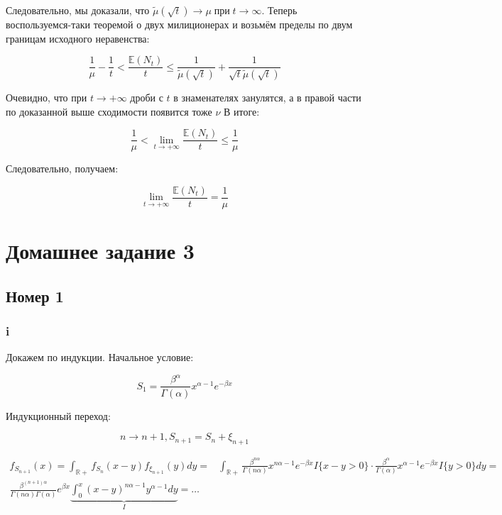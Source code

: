 \documentclass[a4paper,12pt]{article}
\def \mbb{\mathbb}
\def \R{\mbb R}
\def \E{\mbb{E}}
\begin{document}
Следовательно, мы доказали, что $\tilde{\mu}(\sqrt{t}) \rightarrow \mu \operatorname{ при } t \rightarrow \infty$. Теперь воспользуемся-таки теоремой о двух милиционерах и возьмём пределы по двум границам исходного неравенства:


\[ \frac{1}{\mu} - \frac{1 }{t}  < \frac{\E(N_t)}{t} \le \frac{1}{\tilde{\mu}(\sqrt{t})} +\frac{1}{\sqrt{t}\tilde{\mu}(\sqrt{t})} \]

Очевидно, что при $ t \to +\infty $ дроби с $ t $ в знаменателях занулятся, а в правой части по доказанной выше сходимости появится тоже $ \nu $ В итоге:

\[ \frac{1}{\mu}   <  \lim\limits_{t \rightarrow +\infty} \frac{\E(N_t)}{t} \le \frac{1}{\mu}  \]

Следовательно, получаем: 

\[  \lim\limits_{t \rightarrow +\infty} \frac{\E(N_t)}{t} = \frac{1}{\mu}    \]


\section{Домашнее задание 3}

\subsection{Номер 1}
\subsubsection{i}

Докажем по индукции. Начальное условие:

\[ S_1 = \frac{\beta^\alpha}{\Gamma(\alpha)} x^{\alpha-1} e^{-\beta x} \]

Индукционный переход:

\[ n \to n+1, S_{n+1} = S_n + \xi_{n+1} \]

\begin{equation}
\begin{aligned}
f_{S_{n+1}}(x) = \int_{\R+} f_{S_n}(x-y)f_{\xi_{n+1}}(y)dy = & \int_{\R+} \frac{\beta^{n\alpha}}{\Gamma(n\alpha)} x^{n\alpha-1} e^{-\beta x} I\{x-y>0\} \cdot \frac{\beta^\alpha}{\Gamma(\alpha)} x^{\alpha-1} e^{-\beta x} I\{y>0\} dy =\\
\frac{\beta^{(n+1)\alpha}}{\Gamma(n\alpha) \Gamma(\alpha)} e^{\beta x} \underbrace{ \int_{0}^{x} (x-y)^{n\alpha - 1} y^{\alpha-1} dy}_{I} =  \dots
\end{aligned}
\end{equation}
\end{document}
